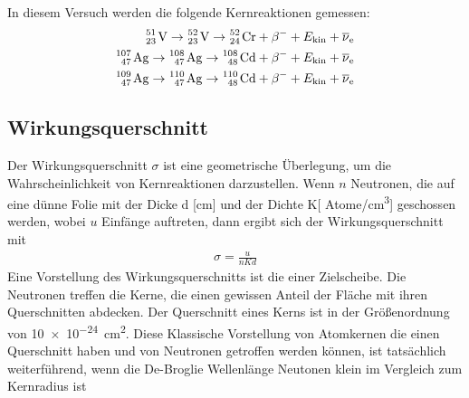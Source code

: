 \noindent
In diesem Versuch werden die folgende Kernreaktionen gemessen:
\begin{align*}
    \ce{^{51}_{23} V}   \rightarrow \ce{^{52}_{23} V}   \rightarrow \ce{^{52}_{24} Cr}  + \beta^{-} + E_\text{kin} + \overline{\nu}_\text{e}  \\
    \ce{^{107}_{47} Ag} \rightarrow \ce{^{108}_{47} Ag} \rightarrow \ce{^{108}_{48} Cd} + \beta^{-} + E_\text{kin} + \overline{\nu}_\text{e}  \\
    \ce{^{109}_{47} Ag} \rightarrow \ce{^{110}_{47} Ag} \rightarrow \ce{^{110}_{48} Cd} + \beta^{-} + E_\text{kin} + \overline{\nu}_\text{e}  \\
\end{align*}


\subsection{Wirkungsquerschnitt}
\label{sec:teo_wirkungsquerschnitt}
Der Wirkungsquerschnitt $\sigma$ ist eine geometrische Überlegung, 
um die Wahrscheinlichkeit von Kernreaktionen darzustellen.
Wenn $n$ Neutronen, die auf eine dünne Folie mit der Dicke d [\unit{\cm}] und der Dichte 
K[ Atome/\unit{\cm\cubed}] geschossen werden, wobei $u$ Einfänge auftreten, dann ergibt sich
der Wirkungsquerschnitt mit
\begin{align*}
    \sigma = \frac{u}{n K d}
\end{align*}
Eine Vorstellung des Wirkungsquerschnitts ist die einer Zielscheibe.
Die Neutronen treffen die Kerne, die einen gewissen Anteil der Fläche mit ihren
Querschnitten abdecken.
Der Querschnitt eines Kerns ist in der Größenordnung von \qty{10e-24}{\cm\squared}.
Diese Klassische Vorstellung von Atomkernen die einen Querschnitt haben und von Neutronen
getroffen werden können, ist tatsächlich weiterführend, wenn die De-Broglie Wellenlänge
Neutonen klein im Vergleich zum Kernradius ist 


